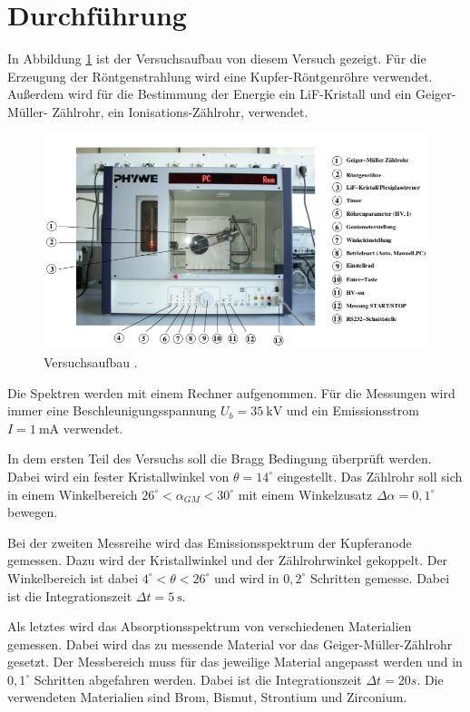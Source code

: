 \section{Durchführung}

In Abbildung \ref{abb:2} ist der Versuchsaufbau von diesem Versuch gezeigt.
Für die Erzeugung der Röntgenstrahlung wird eine Kupfer-Röntgenröhre verwendet.
Außerdem wird für die Bestimmung der Energie ein LiF-Kristall und ein Geiger-Müller-
Zählrohr, ein Ionisations-Zählrohr, verwendet.

\begin{figure}[H]
  \centering
  \includegraphics[width=\textwidth]{content/Versuchsaufbau.png}
  \caption{Versuchsaufbau \cite{1}.}
  \label{abb:2}
\end{figure}

Die Spektren werden mit einem Rechner aufgenommen. Für die Messungen wird immer eine
Beschleunigungsspannung $U_b = \SI{35}{\kilo\volt}$ und ein Emissionsstrom
$I = \SI{1}{\milli\ampere}$ verwendet.

In dem ersten Teil des Versuchs soll die Bragg Bedingung überprüft werden. Dabei wird
ein fester Kristallwinkel von $\theta = 14^\circ$ eingestellt. Das Zählrohr soll sich
in einem Winkelbereich $26^\circ < \alpha_{GM} < 30^\circ$ mit einem
Winkelzusatz $\Delta \alpha = 0,1^\circ$ bewegen.

Bei der zweiten Messreihe wird das Emissionsspektrum der Kupferanode gemessen.
Dazu wird der Kristallwinkel und der Zählrohrwinkel gekoppelt. Der Winkelbereich
ist dabei $4^\circ < \theta < 26^\circ$ und wird in $0,2^\circ$ Schritten
gemesse. Dabei ist die Integrationszeit $\Delta t = \SI{5}{\second}$.

Als letztes wird das Absorptionsspektrum von verschiedenen Materialien gemessen.
Dabei wird das zu messende Material vor das Geiger-Müller-Zählrohr gesetzt. Der Messbereich
muss für das jeweilige Material angepasst werden und in $0,1^\circ$ Schritten abgefahren werden.
Dabei ist die Integrationszeit $\Delta t = 20s$.
Die verwendeten Materialien sind Brom, Bismut, Strontium und Zirconium.
